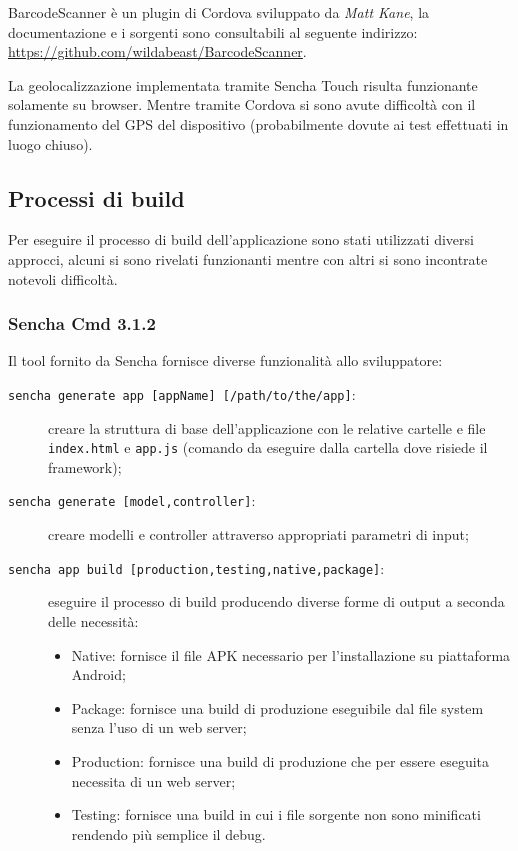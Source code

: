  BarcodeScanner è un plugin di Cordova sviluppato da \emph{Matt Kane}, la documentazione e i sorgenti sono consultabili al seguente indirizzo: \url{https://github.com/wildabeast/BarcodeScanner}.

 La geolocalizzazione implementata tramite Sencha Touch risulta funzionante solamente su browser. Mentre tramite Cordova si sono avute difficoltà con il funzionamento del GPS del dispositivo (probabilmente dovute ai test effettuati in luogo chiuso).

\subsection{Processi di build}
Per eseguire il processo di build dell'applicazione sono stati utilizzati diversi approcci, alcuni si sono rivelati funzionanti mentre con altri si sono incontrate notevoli difficoltà.

\subsubsection{Sencha Cmd 3.1.2}
Il tool fornito da Sencha fornisce diverse funzionalità allo sviluppatore:
\begin{description}
\item[\texttt{sencha generate app [appName] [/path/to/the/app]}:] creare la struttura di base dell'applicazione con le relative cartelle e file \texttt{index.html} e \texttt{app.js} (comando da eseguire dalla cartella dove risiede il framework);
\item[\texttt{sencha generate [model,controller]}:] creare modelli e controller attraverso appropriati parametri di input;
\item[\texttt{sencha app build [production,testing,native,package]}:] eseguire il processo di build producendo diverse forme di output a seconda delle necessità:
	\begin{itemize}
	\item Native: fornisce il file APK necessario per l'installazione su piattaforma Android;
	\item Package: fornisce una build di produzione eseguibile dal file system senza l'uso di un web server;
	\item Production: fornisce una build di produzione che per essere eseguita necessita di un web server;
	\item Testing: fornisce una build in cui i file sorgente non sono minificati rendendo più semplice il debug.
	\end{itemize}
\end{description}

